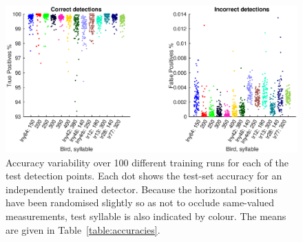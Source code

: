 \documentclass[10pt,letterpaper]{article}
\begin{document}
\begin{figure}
  \includegraphics[width=\textwidth]{Fig3}
  
  \caption{Accuracy variability over 100 different training runs for
    each of the test detection points.  Each dot shows the test-set
    accuracy for an independently trained detector.  Because the
    horizontal positions have been randomised slightly so as not to
    occlude same-valued measurements, test syllable is also indicated
    by colour.  The means are given in Table~\ref{table:accuracies}.}
  \label{fig:accuracies}
\end{figure}
\end{document}
